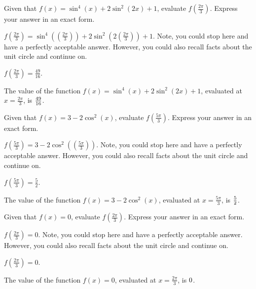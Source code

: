 \begin{shuffle}
\begin{exercise}
Given that $f(x)=\sin ^4(x)+2 \sin ^2(2 x)+1$, evaluate $f(\frac{2 \pi }{3})$. Express your answer in an exact form.
\begin{solution}
\begin{hint}
$f(\frac{2 \pi }{3})=\sin ^4((\frac{2 \pi }{3}))+2 \sin ^2(2 (\frac{2 \pi }{3}))+1$. Note, you could stop here and have a perfectly acceptable answer. However, you could also recall facts about the unit circle and continue on. 
\end{hint}
\begin{hint}
$f(\frac{2 \pi }{3})=\frac{49}{16}$.
\end{hint}
The value of the function $f(x) = \sin ^4(x)+2 \sin ^2(2 x)+1$, evaluated at $x=\frac{2 \pi }{3}$, is ${\frac{49}{16}}$.
\end{solution}
\end{exercise}

\begin{exercise}
Given that $f(x)=3-2 \cos ^2(x)$, evaluate $f(\frac{5 \pi }{3})$. Express your answer in an exact form.
\begin{solution}
\begin{hint}
$f(\frac{5 \pi }{3})=3-2 \cos ^2((\frac{5 \pi }{3}))$. Note, you could stop here and have a perfectly acceptable answer. However, you could also recall facts about the unit circle and continue on. 
\end{hint}
\begin{hint}
$f(\frac{5 \pi }{3})=\frac{5}{2}$.
\end{hint}
The value of the function $f(x) = 3-2 \cos ^2(x)$, evaluated at $x=\frac{5 \pi }{3}$, is ${\frac{5}{2}}$.
\end{solution}
\end{exercise}

\begin{exercise}
Given that $f(x)=0$, evaluate $f(\frac{2 \pi }{3})$. Express your answer in an exact form.
\begin{solution}
\begin{hint}
$f(\frac{2 \pi }{3})=0$. Note, you could stop here and have a perfectly acceptable answer. However, you could also recall facts about the unit circle and continue on. 
\end{hint}
\begin{hint}
$f(\frac{2 \pi }{3})=0$.
\end{hint}
The value of the function $f(x) = 0$, evaluated at $x=\frac{2 \pi }{3}$, is ${0}$.
\end{solution}
\end{exercise}


\end{shuffle}
